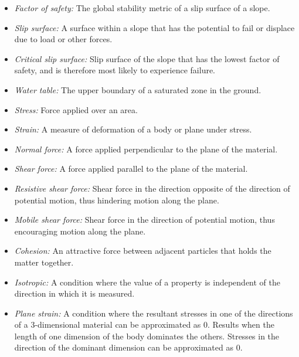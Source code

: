 \documentclass[12pt]{article}
\begin{document}
\begin{itemize}
\item {\textit{Factor of safety:} The global stability metric of a slip surface 
of a slope.}
  
\item {\textit{Slip surface:} A surface within a slope that has the potential 
to fail or displace due to load or other forces.}

\item {\textit{Critical slip surface:} Slip surface of the slope that
  has the lowest factor of safety, and is therefore most likely to
  experience failure.}

\item {\textit{Water table:} The upper boundary of a saturated zone in the 
ground.}

\item {\textit{Stress:} Force applied over an area.}
  
\item {\textit{Strain:} A measure of deformation of a body or plane under 
stress.}
  
\item {\textit{Normal force:} A force applied perpendicular to the
  plane of the material.}
  
\item {\textit{Shear force:} A force applied parallel to the plane of
  the material.}

\item {\textit{Resistive shear force:} Shear force in the direction opposite of 
the direction of potential motion, thus hindering motion along the plane.}
	
\item {\textit{Mobile shear force:} Shear force in the direction of potential 
motion, thus encouraging motion along the plane.}
	
\item {\textit{Cohesion:} An attractive force between adjacent particles that 
holds the matter together.}
  
\item {\textit{Isotropic:} A condition where the value of a property is 
independent of the direction in which it is measured.}
  
\item {\textit{Plane strain:} A condition where the resultant stresses in one 
of the directions of a 3-dimensional material can be approximated as
  0. Results when the length of one dimension of the body dominates
  the others. Stresses in the direction of the dominant dimension can be 
  approximated as 0.}

\end{itemize}
\end{document}
